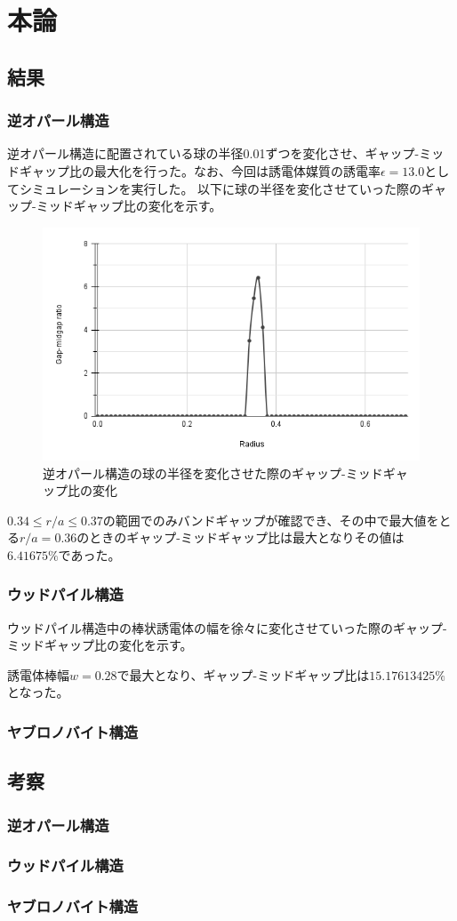 \documentclass[platex,dvipdfmx]{jsreport}
\numberwithin{equation}{section}
\begin{document}
\chapter{本論}


\section{結果}
\subsection{逆オパール構造}
逆オパール構造に配置されている球の半径0.01ずつを変化させ、ギャップ-ミッドギャップ比の最大化を行った。なお、今回は誘電体媒質の誘電率$\epsilon = 13.0$としてシミュレーションを実行した。
以下に球の半径を変化させていった際のギャップ-ミッドギャップ比の変化を示す。

\begin{figure}[htbp]
  \centering
  \includegraphics[width=0.8\linewidth]{results/inverse_opals.png}
  \caption{逆オパール構造の球の半径を変化させた際のギャップ-ミッドギャップ比の変化}
  \label{fig:inv_opal}
\end{figure}

$0.34 \leq r / a \leq 0.37$の範囲でのみバンドギャップが確認でき、その中で最大値をとる$r / a = 0.36$のときのギャップ-ミッドギャップ比は最大となりその値は$6.41675 \% $であった。



\subsection{ウッドパイル構造}
ウッドパイル構造中の棒状誘電体の幅を徐々に変化させていった際のギャップ-ミッドギャップ比の変化を示す。

誘電体棒幅$w = 0.28$で最大となり、ギャップ-ミッドギャップ比は$15.17613425 \%$となった。

\subsection{ヤブロノバイト構造}
\section{考察}
\subsection{逆オパール構造}
\subsection{ウッドパイル構造}
\subsection{ヤブロノバイト構造}
\end{document}
